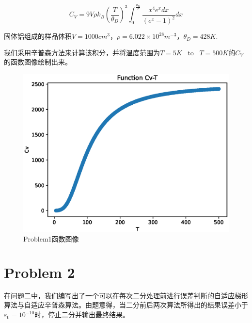 \documentclass[12pt,a4paper]{article}%
\begin{document}
    \begin{equation}
        C_V = 9V \rho k_B (\frac{T}{\theta_D})^3 \int_{0}^{\frac{\theta_D}{T}} \frac{x^4 e^x dx}{(e^x -1)^2}dx\label{eq:equation}
    \end{equation}

    固体铝组成的样品体积$V=1000 cm^3$，$\rho=6.022\times 10^{28} m^{-3}$，$\theta_D=428K$.

    我们采用辛普森方法来计算该积分，并将温度范围为$T=5K$ \ to \ $T=500K$的$C_V$的函数图像绘制出来。


    \begin{figure}[H]%
        \centering
        \begin{minipage}{0.83\textwidth}%
            \centering
            \includegraphics[width=1.0%
            \textwidth]{Problem1}%
            \caption{\fontsize{10pt}{15pt}\selectfont Problem1函数图像}%
        \end{minipage}\label{fig:figure}
    \end{figure}


    \section{Problem 2}
    在问题二中，我们编写出了一个可以在每次二分处理前进行误差判断的自适应梯形算法与自适应辛普森算法。由题意得，当二分前后两次算法所得出的结果误差小于$\varepsilon_0 = 10^{-10}$时，停止二分并输出最终结果。
\end{document}
